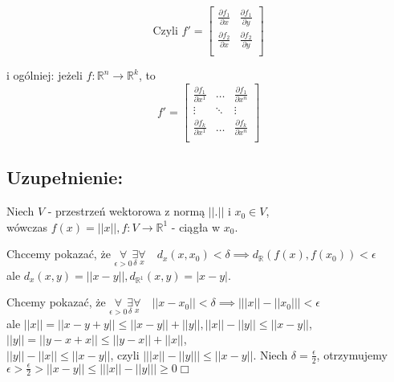 \documentclass[../main.tex]{subfiles}
\begin{document}
$$\text{Czyli } f' = \left [ \begin{matrix}
\frac{\partial f_1}{\partial x}     &\frac{\partial f_1}{\partial y}\\
\frac{\partial f_2}{\partial x}     &\frac{\partial f_2}{\partial y}\\
\end{matrix}\right ] $$

i ogólniej: jeżeli $f: \mathbb{R}^n \to \mathbb{R}^k$, to \\
$$f' = \left [ \begin{matrix}
    \frac{\partial f_1}{\partial x^1}   &\dots   &\frac{\partial f_1}{\partial x^n}\\
    \vdots                              &\ddots  &\vdots\\
    \frac{\partial f_k}{\partial x^1}   &\dots   &\frac{\partial f_k}{\partial x^n}\\\end{matrix}\right ] $$

\subsection{
    Uzupełnienie:
}

Niech $V$ - przestrzeń wektorowa z normą $||.||$ i $x_0\in V$, \\wówczas $f(x)=||x||, f: V\to\mathbb{R}^1$ - ciągła w $x_0$.

\vspace{0.5cm}
\begin{dowod}
\end{dowod}

Chccemy pokazać, że $\underset{\epsilon > 0}{\forall} \underset{\delta}{\exists} \underset{x}{\forall} \quad d_x (x,x_0) < \delta \implies d_{\mathbb{R}} (f(x),f(x_0)) < \epsilon$\\
ale $d_x(x,y) = ||x-y||, d_{\mathbb{R}^1} (x,y) = |x-y|$.
\vspace{0.3cm}

Chcemy pokazać, że $\underset{\epsilon > 0}{\forall} \underset{\delta}{\exists} \underset{x}{\forall} \quad ||x - x_0|| < \delta \implies \big | ||x|| - ||x_0|| \big | < \epsilon$\\
ale $||x|| = ||x-y+y|| \leq ||x-y|| + ||y||, ||x||-||y||\leq ||x-y||$,\\
$||y|| = ||y-x+x||\leq ||y-x|| + ||x||$,\\
$||y||-||x||\leq ||x-y||$, czyli $\big | ||x|| - ||y|| \big | \leq ||x-y||$. Niech $\delta = \frac{\epsilon}{2}$, otrzymujemy $\epsilon > \frac{\epsilon}{2} > ||x-y|| \leq \big | ||x|| - ||y|| \big | \geq 0 \Box$
\end{document}
